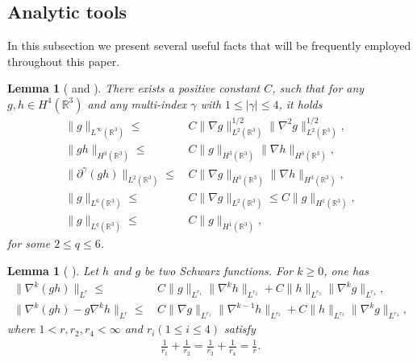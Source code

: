 \documentclass[reqno,11pt]{amsart}
\theoremstyle{plain}
\newtheorem{lem}[thm]{Lemma}
\numberwithin{equation}{section}
\begin{document}
\subsection{Analytic tools}

In this subsection we 
  present several useful facts that will be frequently employed throughout this paper.

\begin{lem}  [ and {\cite[Lemma 2.1]{CDM-krm-2011}}]
\label{LA.1}   
There exists a   positive constant $C$, 
such that for any $g,h\in H^4(\mathbb{R}^3)$ and any multi-index $\gamma$  with $1\leq|\gamma|\leq4$, it holds
\begin{align*}
\|g\|_{L^{\infty}(\mathbb{R}^{3})} \leq\,& C\|\nabla g\|_{L^{2}(\mathbb{R}^{3})}^{1/2}
\|\nabla^{2}g\|_{L^{2}(\mathbb{R}^{3})}^{1/2}, \\
\|gh\|_{H^{3}(\mathbb{R}^{3})} \leq\,& C\|g\|_{H^{3}(\mathbb{R}^{3})}\|\nabla h\|_{H^{3}(\mathbb{R}^{3})}, \\
\|\partial^{\gamma}(gh)\|_{L^{2}(\mathbb{R}^{3})}
 \leq\,& C\|\nabla  g\|_{H^{3}(\mathbb{R}^{3})}\|\nabla  h\|_{H^{3}(\mathbb{R}^{3})},\\
\|g\|_{L^6(\mathbb{R}^3)} \leq\,& C\|\nabla  g\|_{L^2(\mathbb{R}^3)}\leq C\|g\|_{H^1(\mathbb{R}^3)},\\
 \|g\|_{L^q(\mathbb{R}^3)} \leq\,& C\|g\|_{H^1(\mathbb{R}^3)}, 
\end{align*}
for some $2\leq q\leq 6$.
\end{lem} 






\begin{lem}[\! ]\label{LA.2}
Let $h$ and $g$ be two Schwarz functions. For $k\geq 0$, one has
\begin{align*}
\|\nabla^{k}(gh) \|_{L^r} \leq &\, C\|g\|_{L^{r_1} }\|\nabla^{k}h\|_{L^{r_2} }+C\|h\|_{L^{r_3} }\|\nabla^{k}g\|_{L^{r_4} },\\
\|\nabla^{k}(gh)-g\nabla^k h \|_{L^r} \leq  &\, C\|\nabla g\|_{L^{r_1}}\|\nabla^{k-1}h\|_{L^{r_2}}+C\|h\|_{L^{r_3}}\|\nabla^{k}g\|_{L^{r_4}},    
\end{align*}
where $1<r,r_2,r_4<\infty$ and $r_i(1\leq i\leq 4)$ satisfy 
\begin{align*}
\frac{1}{r_1}+\frac{1}{r_2}=\frac{1}{r_3}+\frac{1}{r_4}=\frac{1}{r}.   
\end{align*}
\end{lem}
\end{document}
